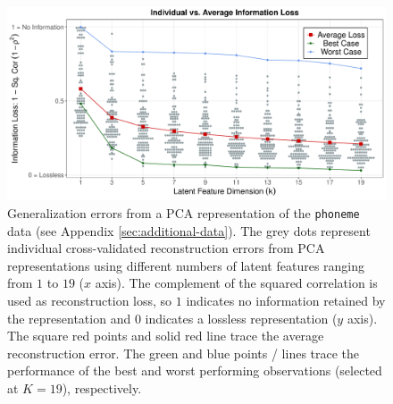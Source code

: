 \begin{figure}
    \centering
    \includegraphics[width=0.75\linewidth]{figures/info-loss.pdf}
    \caption{
    Generalization errors from a PCA representation of the \texttt{phoneme} data (see Appendix \ref{sec:additional-data}). The grey dots represent individual cross-validated reconstruction errors from PCA representations using different numbers of latent features ranging from $1$ to $19$ ($x$ axis).
    The complement of the squared correlation is used as reconstruction loss, so $1$ indicates no information retained by the representation and $0$ indicates a lossless representation ($y$ axis).
    The square red points and solid red line trace the average reconstruction error. The green and blue points / lines trace the performance of the best and worst performing observations (selected at $K=19$), respectively.
    }
    \label{fig:ind-losses}
\end{figure}


